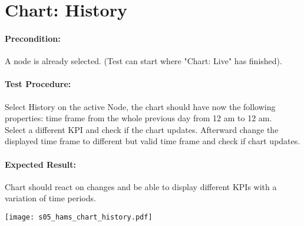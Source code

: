 \documentclass{scrreprt}
\begin{document}
\begin{minipage}[c]{0.4\textwidth}
\section{Chart: History}

\paragraph{Precondition:}
A node is already selected. (Test can start where "Chart: Live" has finished).\\

\paragraph{Test Procedure:}
Select History on the active Node, the chart should have now the following
properties: time frame from the whole previous day from 12 am to 12 am.\\
Select a different KPI and check if the chart updates. Afterward change the displayed
time frame to different but valid time frame and check if chart updates.\\

\paragraph{Expected Result:}
Chart should react on changes and be able to display different KPIs with a
variation of time periods.

\end{minipage}
\hfill
\begin{minipage}[c]{0.5\textwidth}
	\texttt{[image: s05\_hams\_chart\_history.pdf]}
\end{minipage}
\\ \\ \\ \\
\end{document}
